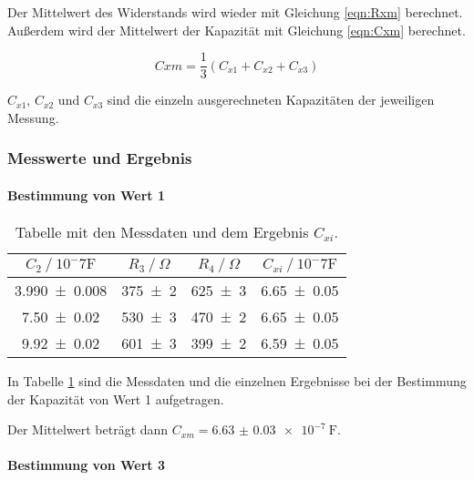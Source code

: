 Der Mittelwert des Widerstands wird wieder mit Gleichung \eqref{eqn:Rxm} berechnet.
Außerdem wird der Mittelwert der Kapazität mit Gleichung \eqref{eqn:Cxm} berechnet.

\begin{equation}
  Cxm = \frac{1}{3}(C_{x1} + C_{x2} + C_{x3})
  \label{eqn:Cxm}
\end{equation}

$C_{x1}$, $C_{x2}$ und $C_{x3}$ sind die einzeln ausgerechneten Kapazitäten der
jeweiligen Messung.

\subsubsection{Messwerte und Ergebnis}
\label{subsubsec:kapme}

\paragraph{Bestimmung von Wert 1}

\begin{table}
  \centering
  \caption{Tabelle mit den Messdaten und dem Ergebnis $C_{xi}$.}
  \label{tab:Kapazitaet1}
  \begin{tabular}{c c c c}
    \toprule
    $C_2 \ /\ 10^-7 \si{\farad}$ & $R_3 \ /\ \si{\Omega}$ & $R_4 \ /\ \si{\Omega}$ & $C_{xi} \ /\ 10^-7 \si{\farad}$\\
    \midrule
    \num{3.990 +- 0.008} & \num{375 +- 2} & \num{625 +- 3} & \num{6.65 +- 0.05}\\
    \num{7.50 +- 0.02} & \num{530 +- 3} & \num{470 +- 2} & \num{6.65 +- 0.05}\\
    \num{9.92 +- 0.02} & \num{601 +- 3} & \num{399 +- 2} & \num{6.59 +- 0.05}\\
    \bottomrule
  \end{tabular}
\end{table}

In Tabelle \ref{tab:Kapazitaet1} sind die Messdaten und die einzelnen
Ergebnisse bei der Bestimmung der Kapazität von Wert 1 aufgetragen.

Der Mittelwert beträgt dann $C_{xm} = \SI{6.63(3)e-7}{\farad}$.

\paragraph{Bestimmung von Wert 3}

